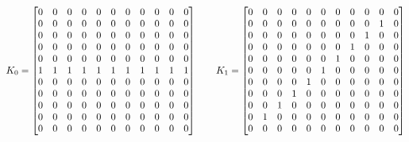 \documentclass[11pt,a4paper]{article}
\begin{document}
\begingroup\footnotesize\setlength{\arraycolsep}{2.2pt}
\[
K_0=\left[\begin{array}{@{}*{11}{c}@{}}
0 & 0 & 0 & 0 & 0 & 0 & 0 & 0 & 0 & 0 & 0 \\
0 & 0 & 0 & 0 & 0 & 0 & 0 & 0 & 0 & 0 & 0 \\
0 & 0 & 0 & 0 & 0 & 0 & 0 & 0 & 0 & 0 & 0 \\
0 & 0 & 0 & 0 & 0 & 0 & 0 & 0 & 0 & 0 & 0 \\
0 & 0 & 0 & 0 & 0 & 0 & 0 & 0 & 0 & 0 & 0 \\
1 & 1 & 1 & 1 & 1 & 1 & 1 & 1 & 1 & 1 & 1 \\
0 & 0 & 0 & 0 & 0 & 0 & 0 & 0 & 0 & 0 & 0 \\
0 & 0 & 0 & 0 & 0 & 0 & 0 & 0 & 0 & 0 & 0 \\
0 & 0 & 0 & 0 & 0 & 0 & 0 & 0 & 0 & 0 & 0 \\
0 & 0 & 0 & 0 & 0 & 0 & 0 & 0 & 0 & 0 & 0 \\
0 & 0 & 0 & 0 & 0 & 0 & 0 & 0 & 0 & 0 & 0
\end{array}\right]\qquad K_1=\left[\begin{array}{@{}*{11}{c}@{}}
0 & 0 & 0 & 0 & 0 & 0 & 0 & 0 & 0 & 0 & 0 \\
0 & 0 & 0 & 0 & 0 & 0 & 0 & 0 & 0 & 1 & 0 \\
0 & 0 & 0 & 0 & 0 & 0 & 0 & 0 & 1 & 0 & 0 \\
0 & 0 & 0 & 0 & 0 & 0 & 0 & 1 & 0 & 0 & 0 \\
0 & 0 & 0 & 0 & 0 & 0 & 1 & 0 & 0 & 0 & 0 \\
0 & 0 & 0 & 0 & 0 & 1 & 0 & 0 & 0 & 0 & 0 \\
0 & 0 & 0 & 0 & 1 & 0 & 0 & 0 & 0 & 0 & 0 \\
0 & 0 & 0 & 1 & 0 & 0 & 0 & 0 & 0 & 0 & 0 \\
0 & 0 & 1 & 0 & 0 & 0 & 0 & 0 & 0 & 0 & 0 \\
0 & 1 & 0 & 0 & 0 & 0 & 0 & 0 & 0 & 0 & 0 \\
0 & 0 & 0 & 0 & 0 & 0 & 0 & 0 & 0 & 0 & 0
\end{array}\right]
\]
\endgroup
\end{document}
